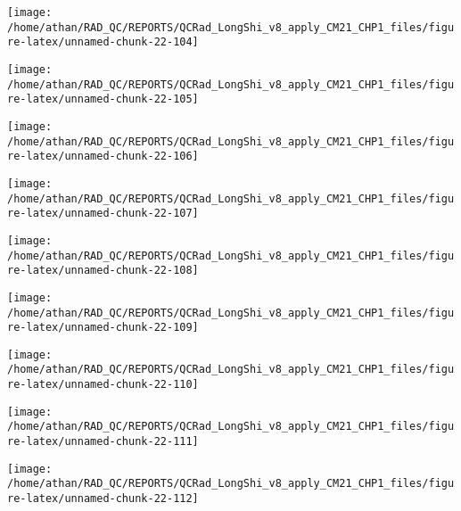\documentclass[
  10pt,
  a4paper,oneside]{article}
\begin{document}
\begin{center}\texttt{[image: /home/athan/RAD\_QC/REPORTS/QCRad\_LongShi\_v8\_apply\_CM21\_CHP1\_files/figure-latex/unnamed-chunk-22-104]} \end{center}

\begin{center}\texttt{[image: /home/athan/RAD\_QC/REPORTS/QCRad\_LongShi\_v8\_apply\_CM21\_CHP1\_files/figure-latex/unnamed-chunk-22-105]} \end{center}

\begin{center}\texttt{[image: /home/athan/RAD\_QC/REPORTS/QCRad\_LongShi\_v8\_apply\_CM21\_CHP1\_files/figure-latex/unnamed-chunk-22-106]} \end{center}

\begin{center}\texttt{[image: /home/athan/RAD\_QC/REPORTS/QCRad\_LongShi\_v8\_apply\_CM21\_CHP1\_files/figure-latex/unnamed-chunk-22-107]} \end{center}

\begin{center}\texttt{[image: /home/athan/RAD\_QC/REPORTS/QCRad\_LongShi\_v8\_apply\_CM21\_CHP1\_files/figure-latex/unnamed-chunk-22-108]} \end{center}

\begin{center}\texttt{[image: /home/athan/RAD\_QC/REPORTS/QCRad\_LongShi\_v8\_apply\_CM21\_CHP1\_files/figure-latex/unnamed-chunk-22-109]} \end{center}

\begin{center}\texttt{[image: /home/athan/RAD\_QC/REPORTS/QCRad\_LongShi\_v8\_apply\_CM21\_CHP1\_files/figure-latex/unnamed-chunk-22-110]} \end{center}

\begin{center}\texttt{[image: /home/athan/RAD\_QC/REPORTS/QCRad\_LongShi\_v8\_apply\_CM21\_CHP1\_files/figure-latex/unnamed-chunk-22-111]} \end{center}

\begin{center}\texttt{[image: /home/athan/RAD\_QC/REPORTS/QCRad\_LongShi\_v8\_apply\_CM21\_CHP1\_files/figure-latex/unnamed-chunk-22-112]} \end{center}
\end{document}
